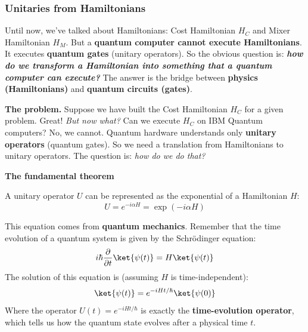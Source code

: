 \subsubsection{Unitaries from Hamiltonians}\label{sec:unitaries-from-hamiltonians}

Until now, we've talked about Hamiltonians: Cost Hamiltonian $H_C$ and Mixer Hamiltonian $H_M$. But a \textbf{quantum computer cannot execute Hamiltonians}. It executes \textbf{quantum gates} (unitary operators). So the obvious question is: \emph{\textbf{how do we transform a Hamiltonian into something that a quantum computer can execute?}} The answer is the bridge between \textbf{physics (Hamiltonians)} and \textbf{quantum circuits (gates)}.

\highspace
\textcolor{Red2}{ \textbf{The problem.}} Suppose we have built the Cost Hamiltonian $H_C$ for a given problem. Great! \emph{But now what?} Can we execute $H_C$ on IBM Quantum computers? No, we cannot. Quantum hardware understands only \textbf{unitary operators} (quantum gates). So we need a translation from Hamiltonians to unitary operators. The question is: \emph{how do we do that?}

\highspace
\textcolor{Green3}{ \textbf{The fundamental theorem}} \begin{theorem}
    A unitary operator $U$ can be represented as the exponential of a Hamiltonian $H$:
    \begin{equation}\label{eq:unitary-from-hamiltonian}
        U = e^{-i \alpha H} = \exp\left(-i \alpha H\right)
    \end{equation}
\end{theorem}
\noindent
This equation comes from \textbf{quantum mechanics}. Remember that the time evolution of a quantum system is given by the Schrödinger equation:
\begin{equation*}
    i \hbar \frac{\partial}{\partial t} \ket{\psi(t)} = H \ket{\psi(t)}
\end{equation*}
The solution of this equation is (assuming $H$ is time-independent):
\begin{equation*}
    \ket{\psi(t)} = e^{-i H t / \hbar} \ket{\psi(0)}
\end{equation*}
Where the operator $U(t) = e^{-i H t / \hbar}$ is exactly the \textbf{time-evolution operator}, which tells us how the quantum state evolves after a physical time $t$. 

